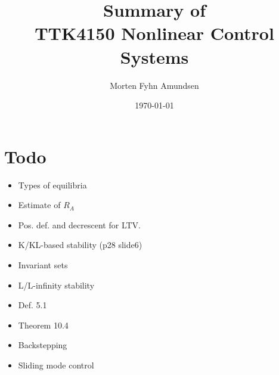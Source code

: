 \documentclass[a4paper,12pt]{article}
\title{Summary of\\TTK4150 Nonlinear Control Systems}
\author{Morten Fyhn Amundsen}
\date{\today}
\begin{document}
\maketitle
\tableofcontents

\section{Todo}
\begin{itemize}
	\item Types of equilibria
	\item Estimate of $R_A$
	\item Pos. def. and decrescent for LTV.
	\item K/KL-based stability (p28 slide6)
	\item Invariant sets
	\item L/L-infinity stability
	\item Def. 5.1
	\item Theorem 10.4
	\item Backstepping
	\item Sliding mode control
\end{itemize}








\end{document}
